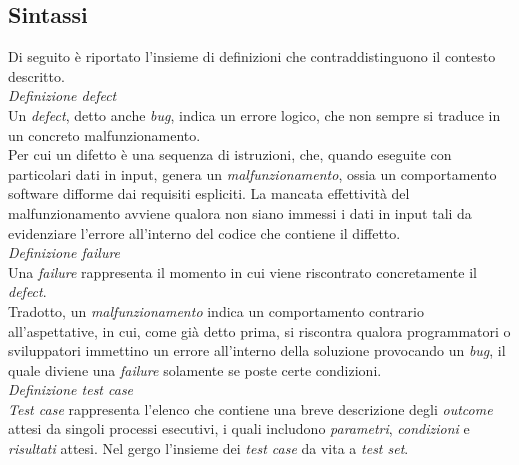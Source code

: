\documentclass{article}
\begin{document}
\subsection*{Sintassi}
\large
Di seguito è riportato l'insieme di definizioni che contraddistinguono il contesto descritto.\vspace*{14pt}\\
\textit{Definizione defect}\\
Un \textit{defect}, detto anche \textit{bug}, indica un errore logico, che non sempre si traduce in un concreto malfunzionamento.\vspace*{7pt}\\
Per cui un difetto è una sequenza di istruzioni, che, quando eseguite con particolari dati in input, genera un \textit{malfunzionamento}, ossia un comportamento software difforme dai requisiti espliciti. La mancata effettività del malfunzionamento avviene qualora non siano immessi i dati in input tali da evidenziare l'errore all'interno del codice che contiene il diffetto.\vspace*{14pt}\\
\textit{Definizione failure}\\
Una \textit{failure} rappresenta il momento in cui viene riscontrato concretamente il \textit{defect}.\vspace*{14pt}\\
Tradotto, un \textit{malfunzionamento} indica un comportamento contrario all'aspettative, in cui, come già detto prima, si riscontra qualora programmatori o sviluppatori immettino un errore all'interno della soluzione provocando un \textit{bug}, il quale diviene una \textit{failure} solamente se poste certe condizioni.\vspace*{14pt}\\
\textit{Definizione test case}\\
\textit{Test case} rappresenta l'elenco che contiene una breve descrizione degli \textit{outcome} attesi da singoli processi esecutivi, i quali includono \textit{parametri}, \textit{condizioni} e \textit{risultati} attesi. Nel gergo l'insieme dei \textit{test case} da vita a \textit{test set}.
\end{document}
